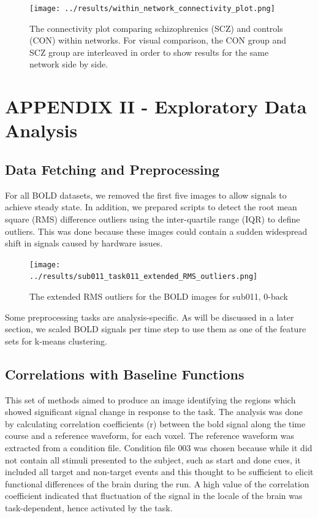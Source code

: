 \documentclass[11pt]{article}
\begin{document}
\begin{figure}[H]
\centering
\texttt{[image: ../results/within\_network\_connectivity\_plot.png]}
\caption{The connectivity plot comparing schizophrenics (SCZ) and controls (CON) within networks. For visual comparison, the CON group and SCZ group are interleaved in order to show results for the same network side by side.}
\end{figure}

\section{APPENDIX II - Exploratory Data Analysis}

\subsection{Data Fetching and Preprocessing}

For all BOLD datasets, we removed the first five images to allow signals to
achieve steady state. In addition, we prepared scripts to detect the root mean
square (RMS) difference outliers using the inter-quartile range (IQR) to define
outliers. This was done because these images could contain a sudden widespread
shift in signals caused by hardware issues.

\begin{figure}[H]
\centering
\texttt{[image: ../results/sub011\_task011\_extended\_RMS\_outliers.png]}
\caption{The extended RMS outliers for the BOLD images for sub011, 0-back}
\end{figure} 

Some preprocessing tasks are analysis-specific. As will be discussed in a later
section, we scaled BOLD signals per time step to use them as one of the feature
sets for k-means clustering. 

\subsection{Correlations with Baseline Functions}

This set of methods aimed to produce an image identifying the regions which showed
significant signal change in response to the task. The analysis was done by calculating 
correlation coefficients (r) between the bold signal along the time course and a reference
waveform, for each voxel. The reference waveform was extracted from a condition file.
Condition file 003 was chosen because while it did not contain all stimuli presented to the
subject, such as start and done cues, it included all target and non-target events and this
thought to be sufficient to elicit functional differences of the brain during the run. 
A high value of the correlation coefficient indicated that fluctuation of the signal in 
the locale of the brain was task-dependent, hence activated by the task. 
\end{document}
